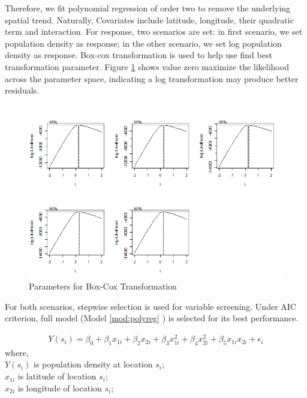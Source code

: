 \documentclass[hidelinks,12pt]{article}
\begin{document}
	Therefore, we fit polynomial regression of order two to remove the underlying spatial trend. Naturally, Covariates include latitude, longitude, their quadratic term and interaction. For response, two scenarios are set: in first scenario, we set population density as response; in the other scenario, we set log population density as response. Box-cox transformation is used to help use find best transformation parameter. Figure \ref{fig:boxcox} shows value zero maximize the likelihood across the parameter space, indicating a log transformation may produce better residuals. 
	\begin{figure}[!ht]
		\includegraphics[width=\textwidth]{boxcox.png}
		\caption{Parameters for Box-Cox Transformation\label{fig:boxcox}}
	\end{figure}
	\FloatBarrier
	
	For both scenarios, stepwise selection is used for variable screening. Under AIC criterion, full model (Model \ref{mod:polyreg} ) is selected for its best performance.
	
	\begin{align}
	\label{mod:polyreg}
	Y(s_i)=\beta_0 +\beta_1x_{1i} +\beta_2x_{2i} +\beta_3x_{1i}^2 +\beta_4x_{2i}^2+\beta_5x_{1i}x_{2i}+\epsilon_i
	\end{align}
	where,\\
	$Y(s_i)$ is population density at location $s_i$;\\
	$x_{1i}$ is latitude of location $s_i$;\\
	$x_{2i}$ is longitude of location $s_i$;\\
	
	
	
\end{document}
